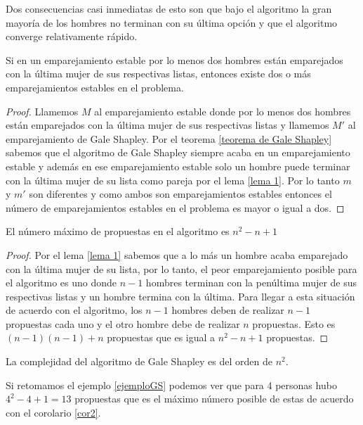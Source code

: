 Dos consecuencias casi inmediatas de esto son que bajo el algoritmo la gran mayoría de los hombres no terminan con su última opción y que el algoritmo converge relativamente rápido. 
\begin{cor}
\label{cor1}
Si en un emparejamiento estable por lo menos dos hombres están emparejados con la última mujer de sus respectivas listas, entonces existe dos o más emparejamientos estables en el problema.
\end{cor}

\begin{proof}
Llamemos $M$ al emparejamiento estable donde por lo menos dos hombres están emparejados con la última mujer de sus respectivas listas y llamemos $M'$ al emparejamiento de Gale Shapley.
Por el teorema \ref{teorema de Gale Shapley} sabemos que el algoritmo de Gale Shapley siempre acaba en un emparejamiento estable y además en ese emparejamiento estable solo un hombre puede terminar con la última mujer de su lista como pareja por el lema \ref{lema 1}.
Por lo tanto $m$ y $m'$ son diferentes y como ambos son emparejamientos estables entonces el número de emparejamientos estables en el problema es mayor o igual a dos. 
\end{proof}

\begin{cor}
\label{cor2}
El número máximo de propuestas en el algoritmo es $n^2-n+1$
\end{cor}

\begin{proof}
Por el lema \ref{lema 1} sabemos que a lo más un hombre acaba emparejado con la última mujer de su lista, por lo tanto, el peor emparejamiento posible para el algoritmo es uno donde $n-1$ hombres terminan con la penúltima mujer de sus respectivas listas y un hombre termina con la última. Para llegar a esta situación de acuerdo con el algoritmo, los $n-1$ hombres deben de realizar $n-1$ propuestas cada uno y el otro hombre debe de realizar $n$ propuestas. Esto es $(n-1)(n-1)+n$ propuestas que es igual a $n^2-n+1$ propuestas.
\end{proof}

\begin{obs}
\label{complejidad1}
La complejidad del algoritmo de Gale Shapley es del orden de $n^2$.
\end{obs}

\begin{eje}
Si retomamos el ejemplo \ref{ejemploGS} podemos ver que para 4 personas hubo $4^{2}-4+1=13$ propuestas que es el máximo número posible de estas de acuerdo con el corolario \ref{cor2}.
\fin
\end{eje}


